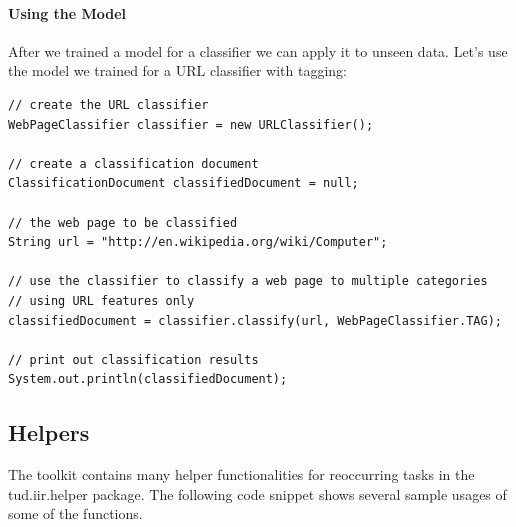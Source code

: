 \documentclass[a4paper,twoside]{book}      %
\begin{document}
\paragraph{Using the Model}
After we trained a model for a classifier we can apply it to unseen data. Let's use the model we trained for a URL classifier with tagging:

\begin{codelisting}
\begin{lstlisting}[frame=tb]
// create the URL classifier
WebPageClassifier classifier = new URLClassifier();

// create a classification document
ClassificationDocument classifiedDocument = null;

// the web page to be classified
String url = "http://en.wikipedia.org/wiki/Computer";

// use the classifier to classify a web page to multiple categories
// using URL features only
classifiedDocument = classifier.classify(url, WebPageClassifier.TAG);

// print out classification results
System.out.println(classifiedDocument);
\end{lstlisting}
\end{codelisting}

\subsection{Helpers}
The toolkit contains many helper functionalities for reoccurring tasks in the tud.iir.helper package.
The following code snippet shows several sample usages of some of the functions.
\end{document}

